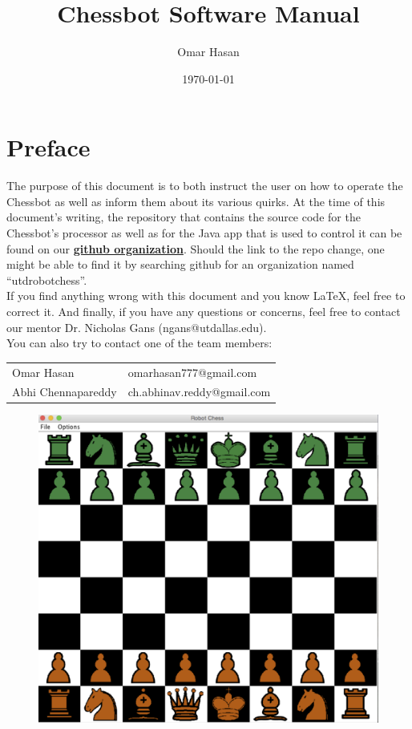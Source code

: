 \documentclass[letterpaper,12pt]{report}
\newcommand{\github}{\href{https://github.com/utdrobotchess}
        {\textbf{github organization}}}
\begin{document}
\title{\textbf{Chessbot Software Manual}}
\author{Omar Hasan}

\date{\today}
\maketitle

\pagebreak

\section*{Preface}
\label{sec:preface}
The purpose of this document is to both instruct the user on how to operate the
Chessbot as well as inform them about its various quirks. At the time of this
document's writing, the repository that contains the source code for the
Chessbot's processor as well as for the Java app that is used to control it can
be found on our \github. Should the link to the repo change, one might be able
to find it by searching github for an organization named ``utdrobotchess''.\\

If you find anything wrong with this document and you know LaTeX, feel free to
correct it. And finally, if you have any questions or concerns, feel free to
contact our mentor Dr. Nicholas Gans (ngans@utdallas.edu).\\

You can also try to contact one of the team members:\\
\begin{center}
\begin{tabular}{l l}
    Omar Hasan & omarhasan777@gmail.com \\
    Abhi Chennapareddy & ch.abhinav.reddy@gmail.com
\end{tabular}
\end{center}

\begin{figure}[!h]
\centering
\includegraphics[width=14cm]{./pics/chessboard.jpg}
\end{figure}
\end{document}
